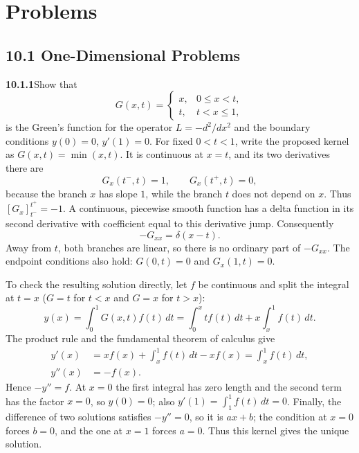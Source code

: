 
\section*{Problems}

\subsection*{10.1 One-Dimensional Problems}

\par\bigskip
\noindent\textbf{10.1.1}\quad Show that
\[
G(x,t)=\begin{cases}
x, & 0\le x<t,\\
t, & t<x\le 1,
\end{cases}
\]
is the Green's function for the operator $L=-d^{2}/dx^{2}$ and the boundary
conditions $y(0)=0$, $y'(1)=0$.
\solution
For fixed $0<t<1$, write the proposed kernel as $G(x,t)=\min(x,t)$.
It is continuous at $x=t$, and its two derivatives there are
\[
G_x(t^-,t)=1,\qquad G_x(t^+,t)=0,
\]
because the branch $x$ has slope $1$, while the branch $t$ does not
depend on $x$.
Thus $[G_x]_{t^-}^{t^+}=-1$. A continuous, piecewise smooth function
has a delta function in its second derivative with coefficient equal to
this derivative jump. Consequently
\[
-G_{xx}=\delta(x-t).
\]
Away from $t$, both branches are linear, so there is no ordinary part
of $-G_{xx}$. The endpoint conditions also hold:
$G(0,t)=0$ and $G_x(1,t)=0$.

To check the resulting solution directly, let $f$ be continuous and split
the integral at $t=x$ ($G=t$ for $t<x$ and $G=x$ for $t>x$):
\[
y(x)=\int_0^1G(x,t)f(t)\,dt
=\int_0^x t f(t)\,dt+x\int_x^1f(t)\,dt.
\]
The product rule and the fundamental theorem of calculus give
\begin{align*}
y'(x)&=xf(x)+\int_x^1f(t)\,dt-xf(x)
      =\int_x^1f(t)\,dt,\\
y''(x)&=-f(x).
\end{align*}
Hence $-y''=f$. At $x=0$ the first integral has zero length and the
second term has the factor $x=0$, so $y(0)=0$; also
$y'(1)=\int_1^1f(t)\,dt=0$. Finally, the difference of two solutions
satisfies $-y''=0$, so it is $ax+b$; the condition at $x=0$ forces
$b=0$, and the one at $x=1$ forces $a=0$. Thus this kernel gives the
unique solution.


